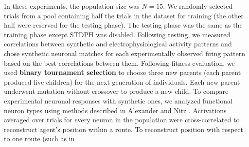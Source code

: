 In these experiments, the
population size was $N = 15$. We randomly selected trials from a pool containing half the trials in the dataset for training (the other half were reserved for the testing phase). The testing phase was the same as the training phase except STDPH was disabled. Following testing, we measured correlations between synthetic and electrophysiological activity patterns and chose synthetic neuronal matches for each experimentally observed firing pattern based on the best correlations between them. Following fitness evaluation, we used
\textbf{binary tournament selection} to choose three new parents (each parent produced five children) for the next generation of individuals. Each new parent underwent mutation without crossover to produce a new child.
To compare experimental neuronal responses with synthetic ones, we analyzed functional neuron types using methods described in Alexander and Nitz \citep{AlexanderNitz2015}. Activations averaged over trials for every neuron in the population were cross-correlated to reconstruct agent’s position within a route. To reconstruct position with respect to one route (such as in 
